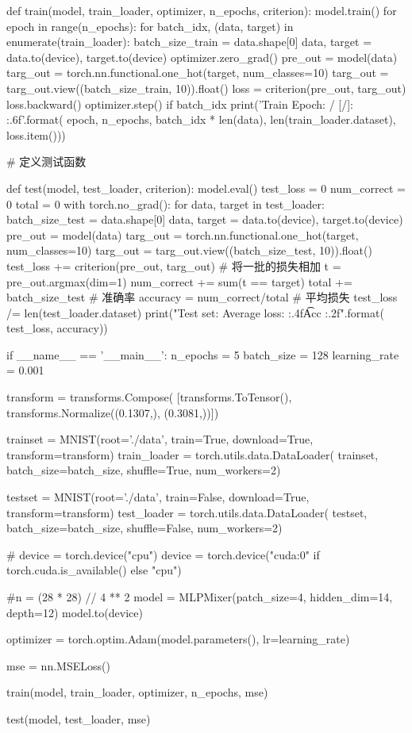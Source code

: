 \documentclass{ctexart}
\begin{document}
\begin{python}
def train(model, train_loader, optimizer, n_epochs, criterion):
    model.train()
    for epoch in range(n_epochs):
        for batch_idx, (data, target) in enumerate(train_loader):
            batch_size_train = data.shape[0]
            data, target = data.to(device), target.to(device)
            optimizer.zero_grad()
            pre_out = model(data)
            targ_out = torch.nn.functional.one_hot(target, num_classes=10)
            targ_out = targ_out.view((batch_size_train, 10)).float()
            loss = criterion(pre_out, targ_out)
            loss.backward()
            optimizer.step()
            if batch_idx %
                print('Train Epoch: {}/{} [{}/{}]\tLoss: {:.6f}'.format(
                    epoch, n_epochs, batch_idx * len(data), len(train_loader.dataset), loss.item()))

# 定义测试函数


def test(model, test_loader, criterion):
    model.eval()
    test_loss = 0
    num_correct = 0
    total = 0
    with torch.no_grad():
        for data, target in test_loader:
            batch_size_test = data.shape[0]
            data, target = data.to(device), target.to(device)
            pre_out = model(data)
            targ_out = torch.nn.functional.one_hot(target, num_classes=10)
            targ_out = targ_out.view((batch_size_test, 10)).float()
            test_loss += criterion(pre_out, targ_out)  # 将一批的损失相加
            t = pre_out.argmax(dim=1)
            num_correct += sum(t == target)
            total += batch_size_test
    # 准确率
    accuracy = num_correct/total
    # 平均损失
    test_loss /= len(test_loader.dataset)
    print("Test set: Average loss: {:.4f}\t Acc {:.2f}".format(
        test_loss, accuracy))


if __name__ == '__main__':
    n_epochs = 5
    batch_size = 128
    learning_rate = 0.001

    transform = transforms.Compose(
        [transforms.ToTensor(),
         transforms.Normalize((0.1307,), (0.3081,))])

    trainset = MNIST(root='./data', train=True,
                     download=True, transform=transform)
    train_loader = torch.utils.data.DataLoader(
        trainset, batch_size=batch_size, shuffle=True, num_workers=2)

    testset = MNIST(root='./data', train=False,
                    download=True, transform=transform)
    test_loader = torch.utils.data.DataLoader(
        testset, batch_size=batch_size, shuffle=False, num_workers=2)

    # device = torch.device("cpu")
    device = torch.device("cuda:0" if torch.cuda.is_available() else "cpu")

    #n = (28 * 28) // 4 ** 2
    model = MLPMixer(patch_size=4, hidden_dim=14, depth=12)
    model.to(device)

    optimizer = torch.optim.Adam(model.parameters(), lr=learning_rate)

    mse = nn.MSELoss()

    train(model, train_loader, optimizer, n_epochs, mse)

    test(model, test_loader, mse)
\end{python}
\end{document}

